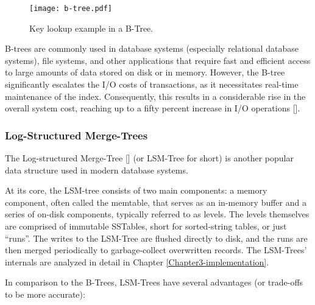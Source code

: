 \begin{figure}[h]
    \centering
    \texttt{[image: b-tree.pdf]}
    \caption{Key lookup example in a B-Tree.}
    \label{fig:b-tree}
\end{figure}

B-trees are commonly used in database systems (especially relational database systems), file systems, and other applications that require fast and efficient access to large amounts of data stored on disk or in memory. However, the B-tree significantly escalates the I/O costs of transactions, as it necessitates real-time maintenance of the index. Consequently, this results in a considerable rise in the overall system cost, reaching up to a fifty percent increase in I/O operations [\cite{lsmtree}].

\subsubsection{Log-Structured Merge-Trees}

The Log-structured Merge-Tree [\cite{lsmtree}] (or LSM-Tree for short) is another popular data structure used in modern database systems.

At its core, the LSM-tree consists of two main components: a memory component, often called the memtable, that serves as an in-memory buffer and a series of on-disk components, typically referred to as levels. The levels themselves are comprised of immutable SSTables, short for sorted-string tables, or just ``runs''. The writes to the LSM-Tree are flushed directly to disk, and the runs are then merged periodically to garbage-collect overwritten records. The LSM-Trees' internals are analyzed in detail in Chapter \ref{Chapter3-implementation}.

In comparison to the B-Trees, LSM-Trees have several advantages (or trade-offs to be more accurate):

